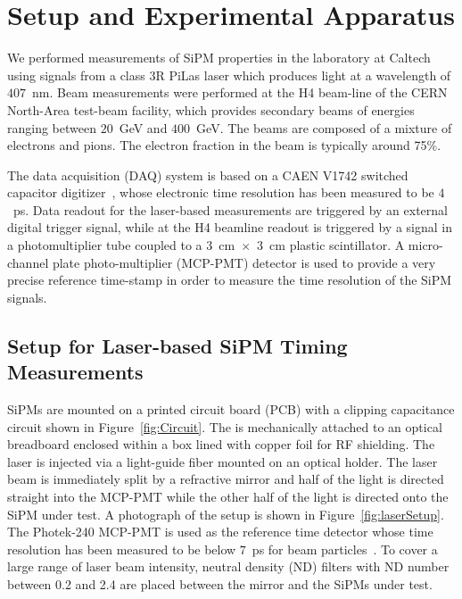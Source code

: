 \section{Setup and Experimental Apparatus }
\label{sec:setup}

We performed measurements of SiPM properties in the laboratory at Caltech using
signals from a class 3R PiLas laser which produces light at a wavelength of
$407$~nm. Beam measurements were performed at the H4 beam-line of the CERN
North-Area test-beam facility, which provides secondary beams of energies
ranging between $20$~GeV and $400$~GeV. The beams are composed of a mixture of
electrons and pions. The electron fraction in the beam is typically around 75\%.

The data acquisition (DAQ) system is based on a CAEN V1742 switched capacitor
digitizer~\cite{DRS4}, whose electronic time resolution has been measured to be
$4$~ps. Data readout for the laser-based measurements are triggered by an
external digital trigger signal, while at the H4 beamline readout is triggered
by a signal in a photomultiplier tube coupled to a
$3$~$\mathrm{cm}$~$\times$~$3$~$\mathrm{cm}$ plastic scintillator. A
micro-channel plate photo-multiplier (MCP-PMT) detector is used to provide a
very precise reference time-stamp in order to measure the time resolution of the 
SiPM signals.

\subsection{Setup for Laser-based SiPM Timing Measurements}

SiPMs are mounted on a printed circuit board (PCB) with a clipping capacitance
circuit shown in Figure~\ref{fig:Circuit}. The is mechanically attached to an
optical breadboard enclosed within a box lined with copper foil for RF
shielding. The laser is injected via a light-guide fiber mounted on an optical
holder. The laser beam is immediately split by a refractive mirror and half of
the light is directed straight into the MCP-PMT while the other half of the
light is directed onto the SiPM under test. A photograph of the setup is shown
in Figure~\ref{fig:laserSetup}. The Photek-240 MCP-PMT is used as the reference
time detector whose time resolution has been measured to be below $7$~ps for
beam particles~\cite{MCPShowerMaxPaper}. To cover a large range of laser beam
intensity, neutral density (ND) filters with ND number between 0.2 and 2.4
are placed between the mirror and the SiPMs under test.

